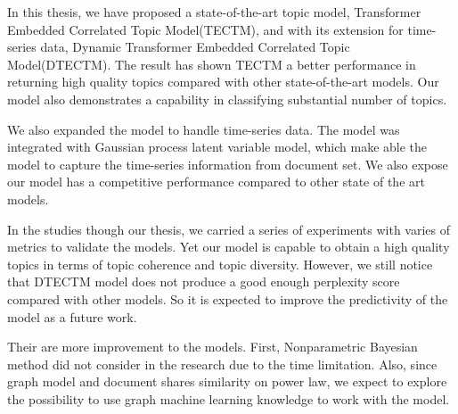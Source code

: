 In this thesis, we have proposed a state-of-the-art topic model, Transformer Embedded Correlated Topic Model(TECTM), and with its extension for time-series data, Dynamic Transformer Embedded Correlated Topic Model(DTECTM). The result has shown TECTM a better performance in returning high quality topics compared with other state-of-the-art models. Our model also demonstrates a capability in classifying substantial number of topics.

We also expanded the model to handle time-series data. The model was integrated with Gaussian process latent variable model, which make able the model to capture the time-series information from document set. We also expose our model has a competitive performance compared to other state of the art models.

In the studies though our thesis, we carried a series of experiments with varies of metrics to validate the models. Yet our model is capable to obtain a high quality topics in terms of topic coherence and topic diversity. However, we still notice that DTECTM model does not produce a good enough perplexity score compared with other models. So it is expected to improve the predictivity of the model as a future work.

Their are more improvement to the models. First, Nonparametric Bayesian method did not consider in the research due to the time limitation. Also, since graph model and document shares similarity on power law, we expect to explore the possibility to use graph machine learning knowledge to work with the model.